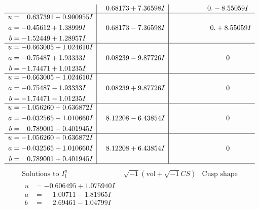 \documentclass[1p]{elsarticle_modified}
\theoremstyle{definition}
\newcommand{\I}{\sqrt{-1}}
\begin{document}
$$\begin{array}{c|c|c}
 & \phantom{-}0.68173 + 7.36598 I & \phantom{-0.000000 } 0. - 8.55059 I \\ \hline\begin{aligned}
u &= \phantom{-}0.637391 - 0.990955 I \\
a &= -0.45612 + 1.38999 I \\
b &= -1.52449 + 1.28957 I\end{aligned}
 & \phantom{-}0.68173 - 7.36598 I & \phantom{-0.000000 -}0. + 8.55059 I \\ \hline\begin{aligned}
u &= -0.663005 + 1.024610 I \\
a &= -0.75487 + 1.93333 I \\
b &= -1.74471 + 1.01235 I\end{aligned}
 & \phantom{-}0.08239 - 9.87726 I & \phantom{-0.000000 } 0 \\ \hline\begin{aligned}
u &= -0.663005 - 1.024610 I \\
a &= -0.75487 - 1.93333 I \\
b &= -1.74471 - 1.01235 I\end{aligned}
 & \phantom{-}0.08239 + 9.87726 I & \phantom{-0.000000 } 0 \\ \hline\begin{aligned}
u &= -1.056260 + 0.636872 I \\
a &= -0.032565 - 1.010660 I \\
b &= \phantom{-}0.789001 - 0.401945 I\end{aligned}
 & \phantom{-}8.12208 - 6.43854 I & \phantom{-0.000000 } 0 \\ \hline\begin{aligned}
u &= -1.056260 - 0.636872 I \\
a &= -0.032565 + 1.010660 I \\
b &= \phantom{-}0.789001 + 0.401945 I\end{aligned}
 & \phantom{-}8.12208 + 6.43854 I & \phantom{-0.000000 } 0\\
 \hline 
 \end{array}$$\newpage$$\begin{array}{c|c|c}  
\text{Solutions to }I^u_{1}& \I (\text{vol} + \sqrt{-1}CS) & \text{Cusp shape}\\
 \hline 
\begin{aligned}
u &= -0.606495 + 1.075940 I \\
a &= \phantom{-}1.00711 - 1.81965 I \\
b &= \phantom{-}2.69461 - 1.04799 I\end{aligned}

\end{array}$$
\end{document}

